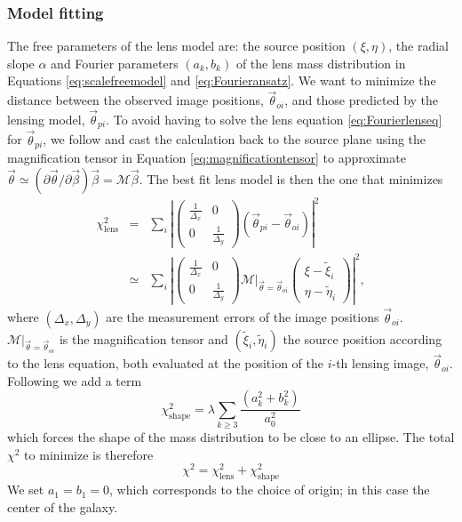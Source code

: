 \documentclass[useAMS,usenatbib]{mnras}
\newcommand{\vect}[1]{\vec{#1}} %
\begin{document}
\subsubsection{Model fitting}

The free parameters of the lens model are: the source position $(\xi,\eta)$, the radial slope $\alpha$ and Fourier parameters $(a_k,b_k)$ of the lens mass distribution in Equations \eqref{eq:scalefreemodel} and \eqref{eq:Fourieransatz}. We want to minimize the distance between the observed image positions, $\vect{\theta}_{oi}$, and those predicted by the lensing model, $\vect{\theta}_{pi}$. To avoid having to solve the lens equation \eqref{eq:Fourierlenseq} for $\vect{\theta}_{pi}$, we follow \citet{1991ApJ...373..354K} and cast the calculation back to the source plane using the magnification tensor in Equation \eqref{eq:magnificationtensor} to approximate $\vect{\theta} \simeq (\partial \vect{\theta} / \partial \vect{\beta}) \vect{\beta} = \mathscr{M} \vect{\beta} $. The best fit lens model is then the one that minimizes
\begin{eqnarray}
\chi^2_\text{lens} &=& \sum_{i} \left|\left( \begin{matrix} \frac{1}{\Delta_x} & 0\\0 & \frac{1}{\Delta_y}\end{matrix}\right) \left( \vect{\theta}_{pi} - \vect{\theta}_{oi} \right)\right|^2\nonumber\\
&\simeq& \sum_{i} \left|\left( \begin{matrix} \frac{1}{\Delta_x} & 0\\0 & \frac{1}{\Delta_y}\end{matrix}\right)  \left.\mathscr{M}\right|_{\vect{\theta}=\vect{\theta}_{oi}} \left( \begin{matrix} \xi - \tilde{\xi}_i \\ \eta - \tilde{\eta}_i \end{matrix} \right) \right|^2,\label{eq:chi2lens}
\end{eqnarray}
where $(\Delta_x,\Delta_y)$ are the measurement errors of the image positions $\vect{\theta}_{oi}$. $\left.\mathscr{M}\right|_{\vect{\theta}=\vect{\theta}_{oi}}$ is the magnification tensor and $(\tilde{\xi}_i,\tilde{\eta}_i)$ the source position according to the lens equation, both evaluated at the position of the $i$-th lensing image, $\vect{\theta}_{oi}$. Following \citet{GlennEC} we add a term
\begin{equation}
\chi^2_\text{shape} = \lambda \sum_{k \geq 3} \frac{\left(a_k^2 +b_k^2 \right)}{a_0^2} \label{eq:chi2shape}
\end{equation}
which forces the shape of the mass distribution to be close to an ellipse. The total $\chi^2$ to minimize is therefore
\begin{equation}
\chi^2 = \chi^2_\text{lens} + \chi^2_\text{shape} \label{eq:chi2total}
\end{equation}
We set $a_1 = b_1 = 0$, which corresponds to the choice of origin; in this case the center of the galaxy.
\end{document}
